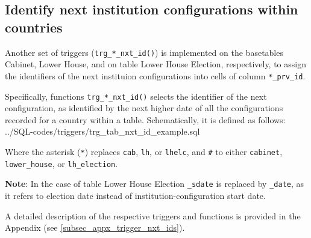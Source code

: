 \subsection{Identify next institution configurations within countries}\label{subsec_trg_prv_ids}

Another set of triggers (\texttt{trg\_*\_nxt\_id()}) is implemented on the basetables Cabinet, Lower House, and on table Lower House Election, respectively, to assign the identifiers of the next instituion configurations into cells of column \texttt{*\_prv\_id}.

Specifically, functions \texttt{trg\_*\_nxt\_id()} selects the identifier of the next  configuration, as identified by the next higher date of all the configurations recorded for a country within a table.
Schematically, it is defined as follows:
%
{../SQL-codes/triggers/trg_tab_nxt_id_example.sql}

Where the asterisk (\texttt{*}) replaces \texttt{cab}, \texttt{lh}, or \texttt{lhelc}, and \texttt{\#} to either \texttt{cabinet}, \texttt{lower\_house}, or \texttt{lh\_election}.

{\bf Note}: In the case of table Lower House Election \texttt{\_sdate} is replaced by \texttt{\_date}, as it refers to election date instead of institution-configuration start date.

A detailed description of the respective triggers and functions is provided in the Appendix (see \ref{subsec_appx_trigger_nxt_ids}).
